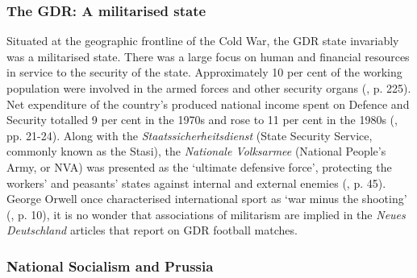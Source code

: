 \subsubsection*{The GDR: A militarised state}

Situated at the geographic frontline of the Cold War, the GDR state invariably was a militarised state. There was a large focus on human and financial resources in service to the security of the state. Approximately 10 per cent of the working population were involved in the armed forces and other security organs (\cite{dennis2000}, p. 225). Net expenditure of the country’s produced national income spent on Defence and Security totalled 9 per cent in the 1970s and rose to 11 per cent in the 1980s (\cite{diedrichehlertwenzke1998}, pp. 21-24). Along with the \textit{Staatssicherheitsdienst} (State Security Service, commonly known as the Stasi), the \textit{Nationale Volksarmee} (National People’s Army, or NVA) was presented as the ‘ultimate defensive force’, protecting the workers’ and peasants’ states against internal and external enemies (\cite{fullbrook1995}, p. 45). George Orwell once characterised international sport as ‘war minus the shooting’ (\cite{orwell1945}, p. 10), it is no wonder that associations of militarism are implied in the \textit{Neues Deutschland} articles that report on GDR football matches.

\subsubsection*{National Socialism and Prussia}

